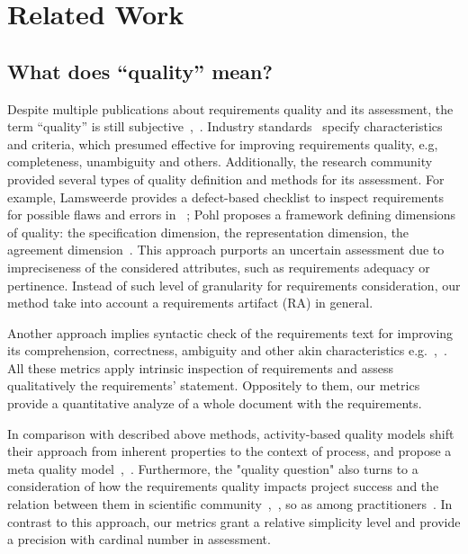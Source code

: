 \section{Related Work}
\label{sec:relatedwork} 

\subsection{What does ``quality'' mean?}

Despite multiple publications about requirements quality and its assessment, 
the term ``quality'' is still subjective~\cite{Mund:2017},~\cite{Femmer:2017}. 
Industry standards~\cite{ISO/IEC/IEEE:2011} specify characteristics and criteria, 
which presumed effective for improving requirements quality, e.g, completeness, unambiguity and others. 
Additionally, the research community provided several types of quality definition and methods for its assessment. 
For example, Lamsweerde provides a defect-based checklist to inspect requirements for possible flaws 
and errors in ~\cite{Lamsweerde:2009}; Pohl proposes a framework defining dimensions of quality: 
the specification dimension, the representation dimension, the agreement dimension~\cite{POHL:1994}.
This approach purports an uncertain assessment due to impreciseness of the considered attributes, 
such as requirements adequacy or pertinence. Instead of such level of granularity for requirements 
consideration, our method take into account a requirements artifact (RA) in general. 

Another approach implies syntactic check of the requirements text for improving its comprehension, 
correctness, ambiguity and other akin characteristics e.g.~\cite{Ferrari:2014},~\cite{Berry:2006}.
All these metrics apply intrinsic inspection of requirements and assess qualitatively the requirements' statement. 
Oppositely to them, our metrics provide a quantitative analyze of a whole document with the requirements.

In comparison with described above methods, activity-based quality models shift their approach from inherent properties 
to the context of process, and propose a meta quality model~\cite{Wagner:2012},~\cite{Femmer:2015}. 
Furthermore, the "quality question" also turns to a consideration of how the requirements quality impacts project success and the relation between 
them in scientific community~\cite{Emam:1995},~\cite{Kamata:2007}, so as among practitioners~\cite{BeattyHokanson:2014}.
In contrast to this approach, our metrics grant a relative simplicity level and provide a precision with cardinal number in assessment.

